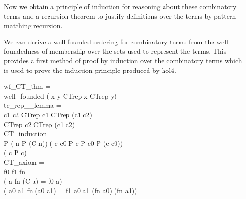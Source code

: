 Now we obtain a principle of induction for reasoning about these combinatory terms and a recursion theorem to justify definitions over the terms by pattern matching recursion.

We can derive a well-founded ordering for combinatory terms from the well-foundedness of membership over the sets used to represent the terms.
This provides a first method of proof by induction over the combinatory terms which is used to prove the induction principle produced by hol4.

\begin{GFT}{}
\+\PrNL{}wf\_CT\_thm\PrNN{} =\\
\+	\MMM{\Zthm} well\_founded (\MMM{\lambda} x y\MMM{\bullet} CTrep x \MMM{\in} CTrep y)\\
\+\PrNL{}tc\MMM{\in}\_rep\_\_lemma\PrNN{} =\\
\+	\MMM{\Zthm} \MMM{\forall} c1 c2\MMM{\bullet} CTrep c1 \MMM{\in}\PrJL{+} CTrep (c1  c2)\\
\+		\MMM{\land} CTrep c2 \MMM{\in}\PrJL{+} CTrep (c1  c2)\\
\+\PrNL{}CT\_induction\PrNN{} =\\
\+	\MMM{\Zthm} \MMM{\forall} P\MMM{\bullet} (\MMM{\forall} n\MMM{\bullet} P (C n)) \MMM{\land} (\MMM{\forall} c c0\MMM{\bullet} P c \MMM{\land} P c0 \MMM{\Rightarrow} P (c  c0))\\
\+		\MMM{\Rightarrow} (\MMM{\forall} c\MMM{\bullet} P c)\\
\+\PrNL{}CT\_axiom\PrNN{} =\\
\+	\MMM{\Zthm} \MMM{\forall} f0 f1\MMM{\bullet} \MMM{\exists} fn\MMM{\bullet}\\
\+		(\MMM{\forall} a\MMM{\bullet} fn (C a) = f0 a)\\
\+           \MMM{\land}	(\MMM{\forall} a0 a1\MMM{\bullet} fn (a0  a1) = f1 a0 a1 (fn a0) (fn a1))\\
\end{GFT}

